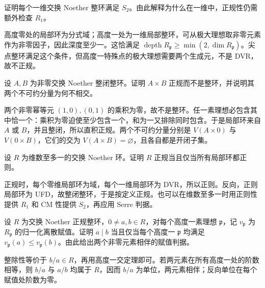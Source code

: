 \begin{exercise}\label{b3:ex:20-one-dimensional-s2}
	证明每个一维交换 Noether 整环满足 \(S_2\)。由此解释为什么在一维中，正规性仍需额外检查 \(R_1\)。
\end{exercise}
\begin{solution}
	高度零处的局部环为分式域；高度一处为一维局部整环，可从极大理想取非零元素作为非零因子，因此深度至少一。这恰满足 \(\operatorname{depth}R_{\mathfrak p}\ge\min(2,\dim R_{\mathfrak p})\)。尖点整环满足这个条件，但高度一特殊点的极大理想需要两个生成元，不是 DVR，故不正规。
\end{solution}

\begin{exercise}\label{b3:ex:20-normal-product}
	设 \(A,B\) 为非零交换 Noether 整闭整环。证明 \(A\times B\) 正规而不是整环，并说明其两个不可约分量为何不相交。
\end{exercise}
\begin{solution}
	两个非零幂等元 \((1,0),(0,1)\) 的乘积为零，故不是整环。任一素理想必包含其中恰一个：乘积为零迫使至少包含一个，和为一又排除同时包含。于是局部环来自 \(A\) 或 \(B\)，并且整闭，所以直积正规。两个不可约分量分别是 \(V(A\times0)\) 与 \(V(0\times B)\)，它们的交为 \(V(A\times B)=\varnothing\)，且各自都是开闭子集。
\end{solution}

\begin{exercise}\label{b3:ex:20-normal-dimension-one}
	设 \(R\) 为维数至多一的交换 Noether 环。证明 \(R\) 正规当且仅当所有局部环都正则。
\end{exercise}
\begin{solution}
	正规时，每个零维局部环为域，每个一维局部环为 DVR，所以正则。反向，正则局部环为 UFD，故整闭整环，于是按定义正规。也可以在维数至多一时用正则性提供 \(R_1\) 和 CM 性提供 \(S_2\)，再应用 Serre 判据。
\end{solution}

\begin{exercise}\label{b3:ex:20-principal-local-test}
	设 \(R\) 为交换 Noether 正规整环，\(0\ne a,b\in R\)，对每个高度一素理想 \(\mathfrak p\)，记 \(v_{\mathfrak p}\) 为 \(R_{\mathfrak p}\) 的归一化离散赋值。证明 \(a\mid b\) 当且仅当每个高度一 \(\mathfrak p\) 均满足 \(v_{\mathfrak p}(a)\le v_{\mathfrak p}(b)\)。由此给出两个非零元素相伴的赋值判据。
\end{exercise}
\begin{solution}
	整除性等价于 \(b/a\in R\)，再用高度一交定理即可。若两元素在所有高度一处的阶数相等，则 \(b/a\) 与 \(a/b\) 均属于 \(R\)，因而 \(b/a\) 为单位，两元素相伴；反向单位在每个赋值处阶数为零。
\end{solution}

